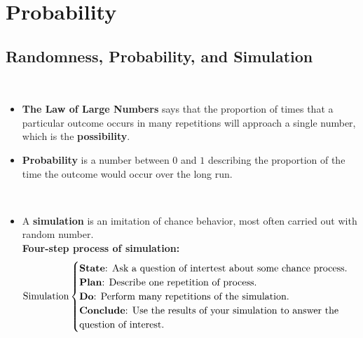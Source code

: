 \documentclass[Main.tex]{subfiles}
\begin{document}
	
	\chapter{Probability}
	
	
	\section{Randomness, Probability, and Simulation}
	
	\begin{exercise} \hfill \\
		\begin{itemize}	
			\item \textbf{The Law of Large Numbers} says that the proportion of times that a particular outcome occurs in many repetitions will approach a single number, which is the \textbf{possibility}.\\			
			\item \textbf{Probability} is a number between $0$ and $1$ describing the proportion of the time the outcome would occur over the long run.
		\end{itemize}
	\end{exercise}	
	
	\begin{exercise}[Simulation] \hfill \\
		\begin{itemize}	
			\item A \textbf{simulation} is an imitation of chance behavior, most often carried out with random number.\hfill \\
			
			\textbf{Four-step process of simulation:}
			\begin{subequations}
				\begin{align}
				\text{Simulation}
				\begin{cases}
				\text{\textbf{State}: Ask a question of intertest about some chance process.}\\
				\text{\textbf{Plan}: Describe one repetition of process.}\\
				\text{\textbf{Do}: Perform many repetitions of the simulation.}\\
				\text{\textbf{Conclude}: Use the results of your simulation to answer the}\\\text{question of interest.}\\
				\end{cases}
				\end{align}
			\end{subequations}
		\end{itemize}
	\end{exercise}									
	
\end{document}
